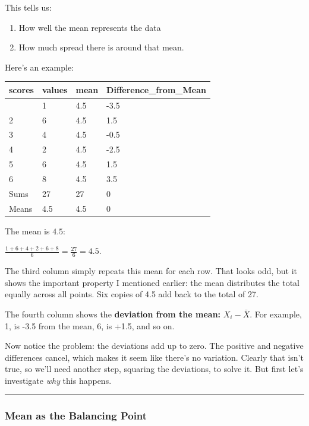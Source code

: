 \documentclass[
  letterpaper,
  DIV=11,
  numbers=noendperiod]{scrreprt}
\begin{document}
This tells us:

\begin{enumerate}
\def\labelenumi{\arabic{enumi}.}
\item
  How well the mean represents the data
\item
  How much spread there is around that mean.
\end{enumerate}

Here's an example:

\begin{longtable}[]{@{}llll@{}}
\toprule\noalign{}
scores & values & mean & Difference\_from\_Mean \\
\midrule\noalign{}
\endhead
\bottomrule\noalign{}
\endlastfoot
1 & 1 & 4.5 & -3.5 \\
2 & 6 & 4.5 & 1.5 \\
3 & 4 & 4.5 & -0.5 \\
4 & 2 & 4.5 & -2.5 \\
5 & 6 & 4.5 & 1.5 \\
6 & 8 & 4.5 & 3.5 \\
Sums & 27 & 27 & 0 \\
Means & 4.5 & 4.5 & 0 \\
\end{longtable}

The mean is \(4.5\):

\(\frac{1+6+4+2+6+8}{6} = \frac{27}{6} = 4.5\).

The third column simply repeats this mean for each row. That looks odd,
but it shows the important property I mentioned earlier: the mean
distributes the total equally across all points. Six copies of 4.5 add
back to the total of 27.

The fourth column shows the \textbf{deviation from the mean:}
\(X_{i}-\bar{X}\). For example, 1, is -3.5 from the mean, 6, is +1.5,
and so on.

Now notice the problem: the deviations add up to zero. The positive and
negative differences cancel, which makes it seem like there's no
variation. Clearly that isn't true, so we'll need another step, squaring
the deviations, to solve it. But first let's investigate \emph{why} this
happens.

\begin{center}\rule{0.5\linewidth}{0.5pt}\end{center}

\subsubsection{Mean as the Balancing
Point}\label{mean-as-the-balancing-point}
\end{document}

